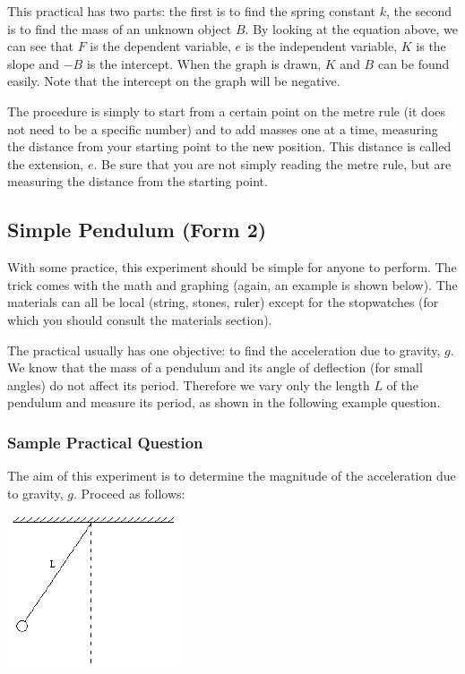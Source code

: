 This practical has two parts: the first is to find the spring constant $k$, the second is
to find the mass of an unknown object $B$. By looking at the equation above, we
can see that $F$ is the dependent variable, $e$ is the independent variable, $K$ is the slope and
$-B$ is the intercept. When the graph is drawn, $K$ and $B$ can be found easily. Note that the
intercept on the graph will be negative.

The procedure is simply to start from a certain point on the metre rule (it does not
need to be a specific number) and to add masses one at a time, measuring the distance
from your starting point to the new position. This distance is called the extension, $e$. Be
sure that you are not simply reading the metre rule, but are measuring the distance from
the starting point.

\subsection{Simple Pendulum (Form 2)}

With some practice, this experiment should be simple for anyone to perform. The
trick comes with the math and graphing (again, an example is shown below). The
materials can all be local (string, stones, ruler) except for the stopwatches (for which you
should consult the materials section).

The practical usually has one objective: to find the acceleration due to gravity, $g$.
We know that the mass of a pendulum and its angle of deflection (for small angles) do
not affect its period. Therefore we vary only the length $L$ of the pendulum and measure
its period, as shown in the following example question.

\subsubsection{Sample Practical Question}

The aim of this experiment is to determine the magnitude of the acceleration due to
gravity, $g$. Proceed as follows:

\begin{center}
\includegraphics{./img/pendulum.png}
\end{center}


